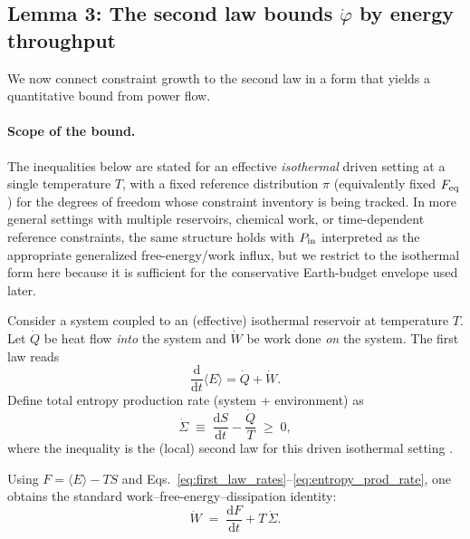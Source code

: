 \documentclass[10pt]{article}
\providecommand{\dd}{\mathrm{d}}
\begin{document}
\subsection{Lemma 3: The second law bounds $\dot\varphi$ by energy throughput}
\label{sec:lemma3_power_bound}

We now connect constraint growth to the second law in a form that yields a quantitative bound from
power flow.

\paragraph{Scope of the bound.}
The inequalities below are stated for an effective \emph{isothermal} driven setting at a single temperature \(T\),
with a fixed reference distribution \(\pi\) (equivalently fixed \(F_{\rm eq}\)) for the degrees of freedom whose
constraint inventory is being tracked. In more general settings with multiple reservoirs, chemical work, or
time-dependent reference constraints, the same structure holds with \(P_{\rm in}\) interpreted as the appropriate
generalized free-energy/work influx, but we restrict to the isothermal form here because it is sufficient for
the conservative Earth-budget envelope used later.


Consider a system coupled to an (effective) isothermal reservoir at temperature $T$.
Let $\dot Q$ be heat flow \emph{into} the system and $\dot W$ be work done \emph{on} the system.
The first law reads
\begin{equation}
\frac{\dd}{\dd t}\langle E\rangle = \dot Q + \dot W.
\label{eq:first_law_rates}
\end{equation}
Define total entropy production rate (system + environment) as
\begin{equation}
\dot\Sigma \;\equiv\; \frac{\dd S}{\dd t} - \frac{\dot Q}{T}\;\ge\;0,
\label{eq:entropy_prod_rate}
\end{equation}
where the inequality is the (local) second law for this driven isothermal setting \cite{Seifert2012ST}.

Using $F=\langle E\rangle-TS$ and Eqs.~\eqref{eq:first_law_rates}--\eqref{eq:entropy_prod_rate},
one obtains the standard work--free-energy--dissipation identity:
\begin{equation}
\dot W \;=\; \frac{\dd F}{\dd t} + T\,\dot\Sigma.
\label{eq:work_balance}
\end{equation}
\end{document}
